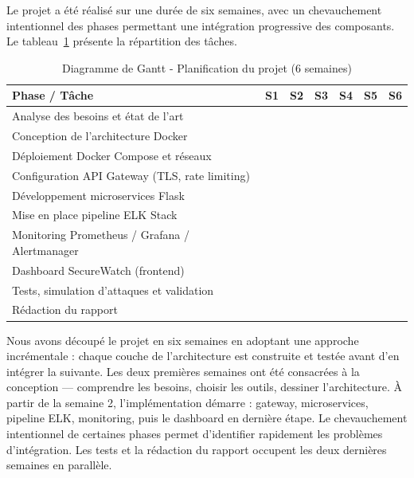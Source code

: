 \documentclass[12pt, a4paper]{report}
\begin{document}
Le projet a été réalisé sur une durée de six semaines, avec un chevauchement intentionnel des phases permettant une intégration progressive des composants. Le tableau~\ref{tab:gantt} présente la répartition des tâches.

\begin{table}[H]
  \centering
  \small
  \setlength{\tabcolsep}{4pt}
  \caption{Diagramme de Gantt - Planification du projet (6 semaines)}
  \label{tab:gantt}
  \begin{tabular}{|l|c|c|c|c|c|c|}
    \hline
    \rowcolor{NavyBlue!15}
    \textbf{Phase / Tâche} & \textbf{S1} & \textbf{S2} & \textbf{S3} & \textbf{S4} & \textbf{S5} & \textbf{S6} \\
    \hline
    Analyse des besoins et état de l'art
      & \cellcolor{emsigreen!60} & \cellcolor{emsigreen!60} & & & & \\
    \hline
    Conception de l'architecture Docker
      & \cellcolor{emsigreen!60} & \cellcolor{emsigreen!60} & & & & \\
    \hline
    Déploiement Docker Compose et réseaux
      & & \cellcolor{emsigreen!60} & \cellcolor{emsigreen!60} & & & \\
    \hline
    Configuration API Gateway (TLS, rate limiting)
      & & \cellcolor{emsigreen!60} & \cellcolor{emsigreen!60} & & & \\
    \hline
    Développement microservices Flask
      & & & \cellcolor{emsigreen!60} & \cellcolor{emsigreen!60} & & \\
    \hline
    Mise en place pipeline ELK Stack
      & & & \cellcolor{emsigreen!60} & \cellcolor{emsigreen!60} & & \\
    \hline
    Monitoring Prometheus / Grafana / Alertmanager
      & & & & \cellcolor{emsigreen!60} & \cellcolor{emsigreen!60} & \\
    \hline
    Dashboard SecureWatch (frontend)
      & & & & & \cellcolor{emsigreen!60} & \cellcolor{emsigreen!60} \\
    \hline
    Tests, simulation d'attaques et validation
      & & & & & \cellcolor{emsigreen!60} & \cellcolor{emsigreen!60} \\
    \hline
    Rédaction du rapport
      & & & & & \cellcolor{emsigreen!30} & \cellcolor{emsigreen!60} \\
    \hline
  \end{tabular}
\end{table}

\medskip
Nous avons découpé le projet en six semaines en adoptant une approche incrémentale : chaque couche de l'architecture est construite et testée avant d'en intégrer la suivante. Les deux premières semaines ont été consacrées à la conception — comprendre les besoins, choisir les outils, dessiner l'architecture. À partir de la semaine 2, l'implémentation démarre : gateway, microservices, pipeline ELK, monitoring, puis le dashboard en dernière étape. Le chevauchement intentionnel de certaines phases permet d'identifier rapidement les problèmes d'intégration. Les tests et la rédaction du rapport occupent les deux dernières semaines en parallèle.
\end{document}
